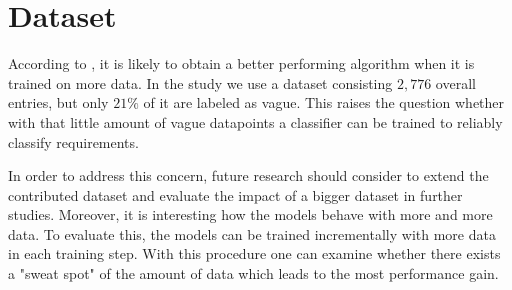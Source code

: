 \section{Dataset}
\label{chp:future_work:sec:dataset}
According to \textcite{Domingos:2012}, it is likely to obtain a better performing algorithm when it is trained on more data.
In the study we use a dataset consisting $2,776$ overall entries, but only $21\%$ of it are labeled as vague.
This raises the question whether with that little amount of vague datapoints a classifier can be trained to reliably classify requirements.

In order to address this concern, future research should consider to extend the contributed dataset and evaluate the impact of a bigger dataset in further studies.
Moreover, it is interesting how the models behave with more and more data.
To evaluate this, the models can be trained incrementally with more data in each training step.
With this procedure one can examine whether there exists a "sweat spot" of the amount of data which leads to the most performance gain.
